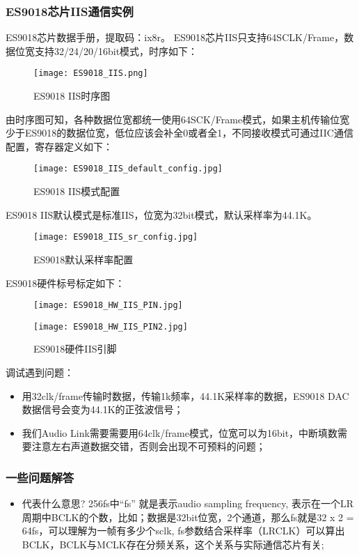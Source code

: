 \subsubsection{ES9018芯片IIS通信实例}
ES9018芯片数据手册，提取码：ix8r。\newline
ES9018芯片IIS只支持64SCLK/Frame，数据位宽支持32/24/20/16bit模式，时序如下：
\begin{figure}[H]
\centering
\texttt{[image: ES9018\_IIS.png]}
\caption{ES9018 IIS时序图}
\end{figure}
由时序图可知，各种数据位宽都统一使用64SCK/Frame模式，如果主机传输位宽少于ES9018的数据位宽，低位应该会补全0或者全1，不同接收模式可通过IIC通信配置，寄存器定义如下：
\begin{figure}[H]
\centering
\texttt{[image: ES9018\_IIS\_default\_config.jpg]}
\caption{ES9018 IIS模式配置}
\end{figure}
ES9018 IIS默认模式是标准IIS，位宽为32bit模式，默认采样率为44.1K。
\begin{figure}[H]
\centering
\texttt{[image: ES9018\_IIS\_sr\_config.jpg]}
\caption{ES9018默认采样率配置}
\end{figure}
ES9018硬件标号标定如下：
\begin{figure}[H]
\centering
\texttt{[image: ES9018\_HW\_IIS\_PIN.jpg]}
\end{figure}
\begin{figure}[H]
\centering
\texttt{[image: ES9018\_HW\_IIS\_PIN2.jpg]}
\caption{ES9018硬件IIS引脚}
\end{figure}

调试遇到问题：
\begin{itemize}
\item 用32clk/frame传输时数据，传输1k频率，44.1K采样率的数据，ES9018 DAC数据信号会变为44.1K的正弦波信号；
\item 我们Audio Link需要需要用64clk/frame模式，位宽可以为16bit，中断填数需要注意左右声道数据交错，否则会出现不可预料的问题；
\end{itemize}

\subsubsection{一些问题解答}
\begin{itemize}
    \item {}代表什么意思?\newline
        256fs中“fs” 就是表示audio sampling frequency, 表示在一个LR周期中BCLK的个数，比如；数据是32bit位宽，2个通道，那么fs就是32 x 2 = 64fs，可以理解为一帧有多少个sclk, fs参数结合采样率（LRCLK）可以算出BCLK，BCLK与MCLK存在分频关系，这个关系与实际通信芯片有关;
\end{itemize}
